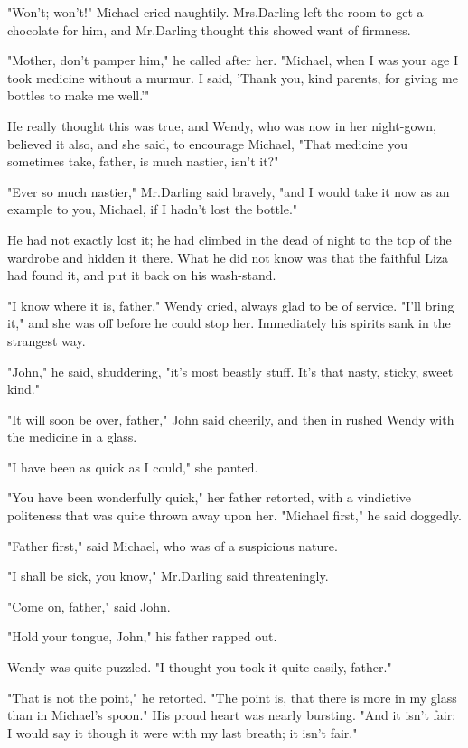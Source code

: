 "Won't; won't!\@" Michael cried naughtily.
Mrs.\@ Darling left the room to get a chocolate for him,
and Mr.\@ Darling thought this showed want of firmness.

"Mother, don't pamper him," he called after her.
"Michael, when I was your age I took medicine without a murmur.
I said, 'Thank you, kind parents, for giving me bottles to make me well.'"

He really thought this was true,
and Wendy, who was now in her night-gown, believed it also,
and she said, to encourage Michael,
"That medicine you sometimes take, father, is much nastier, isn't it?"

"Ever so much nastier," Mr.\@ Darling said bravely,
"and I would take it now as an example to you, Michael, if I hadn't lost the bottle."

He had not exactly lost it;
he had climbed in the dead of night to the top of the wardrobe and hidden it there.
What he did not know was that the faithful Liza had found it, and put it back on his wash-stand.

"I know where it is, father," Wendy cried, always glad to be of service.
"I'll bring it," and she was off before he could stop her.
Immediately his spirits sank in the strangest way.

"John," he said, shuddering, "it's most beastly stuff.
It's that nasty, sticky, sweet kind."

"It will soon be over, father," John said cheerily,
and then in rushed Wendy with the medicine in a glass.

"I have been as quick as I could," she panted.

"You have been wonderfully quick," her father retorted,
with a vindictive politeness that was quite thrown away upon her.
"Michael first," he said doggedly.

"Father first," said Michael, who was of a suspicious nature.

"I shall be sick, you know," Mr.\@ Darling said threateningly.

"Come on, father," said John.

"Hold your tongue, John," his father rapped out.

Wendy was quite puzzled.
"I thought you took it quite easily, father."

"That is not the point," he retorted.
"The point is, that there is more in my glass than in Michael's spoon."
His proud heart was nearly bursting.
"And it isn't fair:
I would say it though it were with my last breath;
it isn't fair."

